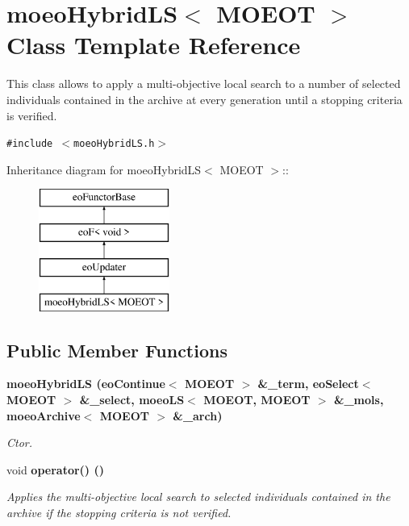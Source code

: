 \section{moeo\-Hybrid\-LS$<$ MOEOT $>$ Class Template Reference}
\label{classmoeoHybridLS}
This class allows to apply a multi-objective local search to a number of selected individuals contained in the archive at every generation until a stopping criteria is verified.  


{\tt \#include $<$moeo\-Hybrid\-LS.h$>$}

Inheritance diagram for moeo\-Hybrid\-LS$<$ MOEOT $>$::\begin{figure}[H]
\begin{center}
\leavevmode
\includegraphics[height=4cm]{classmoeoHybridLS}
\end{center}
\end{figure}
\subsection*{Public Member Functions}
\begin{CompactItemize}
\item 
\bf{moeo\-Hybrid\-LS} (\bf{eo\-Continue}$<$ MOEOT $>$ \&\_\-term, \bf{eo\-Select}$<$ MOEOT $>$ \&\_\-select, \bf{moeo\-LS}$<$ MOEOT, MOEOT $>$ \&\_\-mols, \bf{moeo\-Archive}$<$ MOEOT $>$ \&\_\-arch)
\begin{CompactList}\small\item\em Ctor. \item\end{CompactList}\item 
void \bf{operator()} ()\label{classmoeoHybridLS_bd35c0f0e03914b1b669cb064310d3eb}

\begin{CompactList}\small\item\em Applies the multi-objective local search to selected individuals contained in the archive if the stopping criteria is not verified. \item\end{CompactList}\end{CompactItemize}

